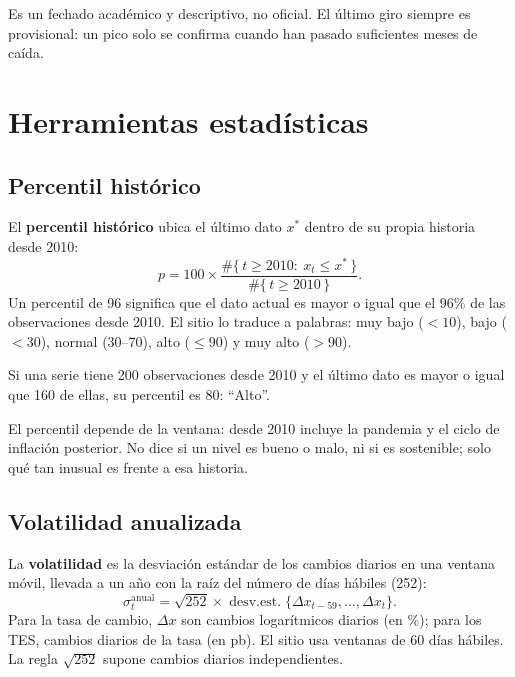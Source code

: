 \begin{alerta}
Es un fechado académico y descriptivo, no oficial. El último giro siempre es provisional: un pico solo se confirma
cuando han pasado suficientes meses de caída.
\end{alerta}

\chapter{Herramientas estadísticas}
\label{es:f:estadistica}

\section{Percentil histórico}
\label{es:f:percentil}
El \textbf{percentil histórico} ubica el último dato $x^*$ dentro de su propia historia desde 2010:
\[
p=100\times\frac{\#\{\,t\ge 2010:\ x_t\le x^*\,\}}{\#\{\,t\ge2010\,\}}.
\]
Un percentil de 96 significa que el dato actual es mayor o igual que el 96\% de las observaciones desde 2010. El
sitio lo traduce a palabras: muy bajo ($<10$), bajo ($<30$), normal (30--70), alto ($\le90$) y muy alto ($>90$).

\begin{dato}
Si una serie tiene 200 observaciones desde 2010 y el último dato es mayor o igual que 160 de ellas, su percentil es
80: ``Alto''.
\end{dato}

\begin{alerta}
El percentil depende de la ventana: desde 2010 incluye la pandemia y el ciclo de inflación posterior. No dice si un
nivel es bueno o malo, ni si es sostenible; solo qué tan inusual es frente a esa historia.
\end{alerta}

\section{Volatilidad anualizada}
\label{es:f:volatilidad}
La \textbf{volatilidad} es la desviación estándar de los cambios diarios en una ventana móvil, llevada a un año con
la raíz del número de días hábiles (252):
\[
\sigma^{\text{anual}}_t=\sqrt{252}\times\operatorname{desv.est.}\{\Delta x_{t-59},\dots,\Delta x_t\}.
\]
Para la tasa de cambio, $\Delta x$ son cambios logarítmicos diarios (en \%); para los TES, cambios diarios de la
tasa (en pb). El sitio usa ventanas de 60 días hábiles. La regla $\sqrt{252}$ supone cambios diarios
independientes.

